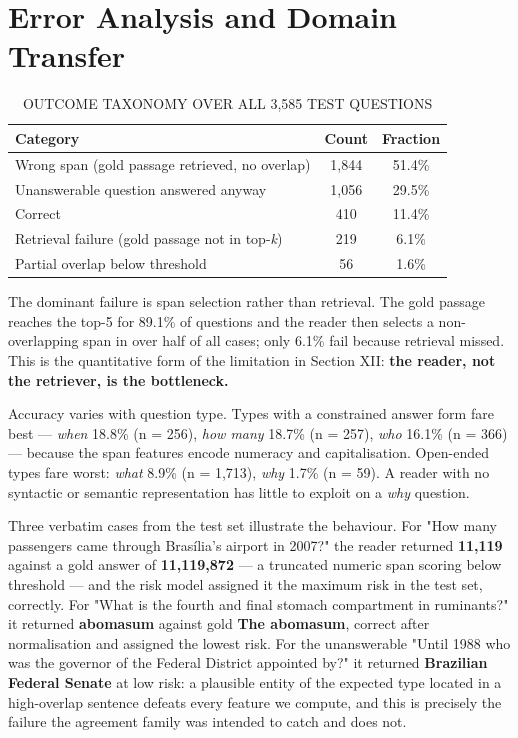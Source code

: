\documentclass[conference]{IEEEtran}
\begin{document}
\section{Error Analysis and Domain Transfer}

\begin{table}[t]\centering\caption{OUTCOME TAXONOMY OVER ALL 3,585 TEST QUESTIONS}\label{tab:7}\footnotesize
\begin{tabular}{lcc}\hline
\textbf{Category} & \textbf{Count} & \textbf{Fraction} \\ \hline
Wrong span (gold passage retrieved, no overlap) & 1,844 & 51.4\% \\
Unanswerable question answered anyway & 1,056 & 29.5\% \\
Correct & 410 & 11.4\% \\
Retrieval failure (gold passage not in top-\emph{k}) & 219 & 6.1\% \\
Partial overlap below threshold & 56 & 1.6\% \\
\hline\end{tabular}\end{table}

The dominant failure is span selection rather than retrieval. The gold passage reaches the top-5 for 89.1\% of questions and the reader then selects a non-overlapping span in over half of all cases; only 6.1\% fail because retrieval missed. This is the quantitative form of the limitation in Section XII: \textbf{the reader, not the retriever, is the bottleneck.}

Accuracy varies with question type. Types with a constrained answer form fare best --- \emph{when} 18.8\% (n = 256), \emph{how many} 18.7\% (n = 257), \emph{who} 16.1\% (n = 366) --- because the span features encode numeracy and capitalisation. Open-ended types fare worst: \emph{what} 8.9\% (n = 1,713), \emph{why} 1.7\% (n = 59). A reader with no syntactic or semantic representation has little to exploit on a \emph{why} question.

Three verbatim cases from the test set illustrate the behaviour. For "How many passengers came through Bras\'ilia's airport in 2007?" the reader returned \textbf{11,119} against a gold answer of \textbf{11,119,872} --- a truncated numeric span scoring below threshold --- and the risk model assigned it the maximum risk in the test set, correctly. For "What is the fourth and final stomach compartment in ruminants?" it returned \textbf{abomasum} against gold \textbf{The abomasum}, correct after normalisation and assigned the lowest risk. For the unanswerable "Until 1988 who was the governor of the Federal District appointed by?" it returned \textbf{Brazilian Federal Senate} at low risk: a plausible entity of the expected type located in a high-overlap sentence defeats every feature we compute, and this is precisely the failure the agreement family was intended to catch and does not.
\end{document}
